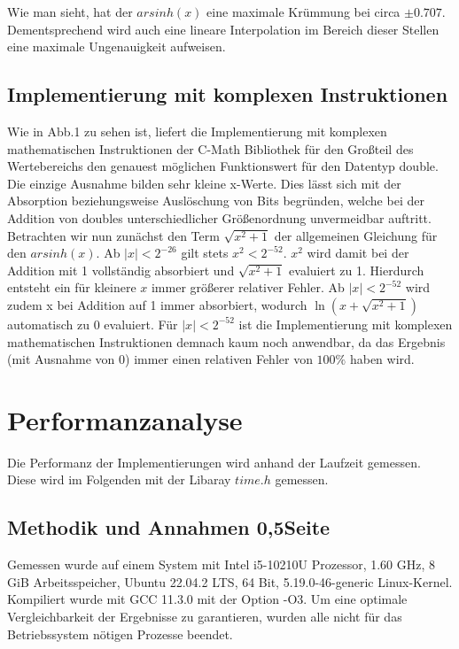 \documentclass[course=erap] {aspdoc}
\begin{document}
    Wie man sieht, hat der $arsinh(x)$ eine maximale Krümmung bei circa $\pm 0.707$. Dementsprechend wird auch eine lineare Interpolation im Bereich dieser Stellen eine maximale Ungenauigkeit aufweisen.

    \subsection{Implementierung mit komplexen Instruktionen}
    Wie in Abb.1 zu sehen ist, liefert die Implementierung mit komplexen mathematischen Instruktionen der C-Math Bibliothek für den Großteil des Wertebereichs den genauest möglichen Funktionswert für den Datentyp double. Die einzige Ausnahme bilden sehr kleine x-Werte. Dies lässt sich mit der Absorption beziehungsweise Auslöschung von Bits begründen, welche bei der Addition von doubles unterschiedlicher Größenordnung unvermeidbar auftritt. Betrachten wir nun zunächst den Term $\sqrt{x^2 + 1}$ der allgemeinen Gleichung für den $arsinh(x)$. Ab $|x|<2^{-26}$ gilt stets $x^2<2^{-52}$. $x^2$ wird damit bei der Addition mit 1 vollständig absorbiert und $\sqrt{x^2 + 1}$ evaluiert zu 1. Hierdurch entsteht ein für kleinere $x$ immer größerer relativer Fehler. Ab $|x|<2^{-52}$ wird zudem x bei Addition auf 1 immer absorbiert, wodurch $\ln{(x+\sqrt{x^2 + 1})}$ automatisch zu 0 evaluiert. Für $|x|<2^{-52}$ ist die Implementierung mit komplexen mathematischen Instruktionen demnach kaum noch anwendbar, da das Ergebnis (mit Ausnahme von 0) immer einen relativen Fehler von $100\%$ haben wird.


    \section{Performanzanalyse}
    Die Performanz der Implementierungen wird anhand der Laufzeit gemessen.
    Diese wird im Folgenden mit der Libaray $time.h$ gemessen.

    \subsection{Methodik und Annahmen 0,5Seite}

    Gemessen wurde auf einem System mit Intel i5-10210U Prozessor, 1.60 GHz, 8 GiB Arbeitsspeicher, Ubuntu 22.04.2 LTS, 64 Bit, 5.19.0-46-generic Linux-Kernel.
    Kompiliert wurde mit GCC 11.3.0 mit der Option -O3. Um eine optimale Vergleichbarkeit der Ergebnisse zu garantieren, wurden alle nicht für das Betriebssystem nötigen Prozesse beendet.
\end{document}
